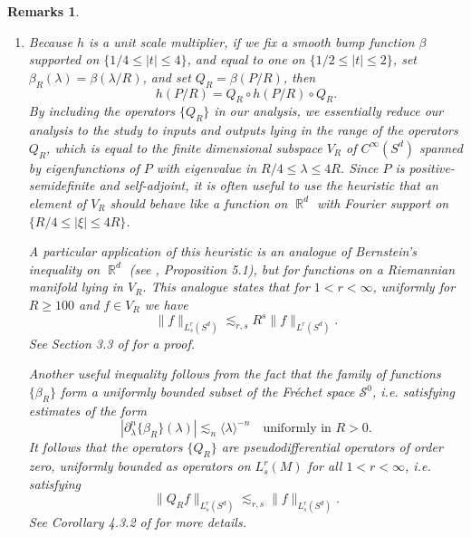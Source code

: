 \documentclass[dvipsnames,letterpaper,12pt]{article}
\DeclareMathOperator{\RR}{\mathbb{R}}
\newtheorem{remarks}[theorem]{Remarks}
\begin{document}
\begin{remarks}
\begin{enumerate}
    \item Because $h$ is a unit scale multiplier, if we fix a smooth bump function $\beta$ supported on $\{ 1/4 \leq |t| \leq 4 \}$, and equal to one on $\{ 1/2 \leq |t| \leq 2 \}$, set $\beta_R(\lambda) = \beta(\lambda / R)$, and set $Q_R = \beta(P/R)$, then
    \[ h(P/R) = Q_R \circ h(P/R) \circ Q_R. \]
    By including the operators $\{ Q_R \}$ in our analysis, we essentially reduce our analysis to the study to inputs and outputs lying in the range of the operators $Q_R$, which is equal to the finite dimensional subspace $V_R$ of $C^\infty(S^d)$ spanned by eigenfunctions of $P$ with eigenvalue in $R/4 \leq \lambda \leq 4R$. Since $P$ is positive-semidefinite and self-adjoint, it is often useful to use the heuristic that an element of $V_R$ should behave like a function on $\RR^d$ with Fourier support on $\{ R/4 \leq |\xi| \leq 4R \}$.

    A particular application of this heuristic is an analogue of Bernstein's inequality on $\RR^d$ (see \cite{Wolff},  Proposition 5.1), but for functions on a Riemannian manifold lying in $V_R$. This analogue states that for $1 < r < \infty$, uniformly for $R \geq 100$ and $f \in V_R$ we have
    \begin{equation} \label{ManifoldBernsteinInequality}
        \| f \|_{L^r_s(S^d)} \lesssim_{r,s} R^s \| f \|_{L^r(S^d)}.
    \end{equation}
    See Section 3.3 of \cite{Sogge} for a proof.

    Another useful inequality follows from the fact that the family of functions $\{ \beta_R \}$ form a uniformly bounded subset of the Fr\'{e}chet space $\mathcal{S}^0$, i.e. satisfying estimates of the form
    \[ |\partial_\lambda^n \{ \beta_R \}(\lambda)| \lesssim_n \langle \lambda \rangle^{-n} \quad\text{uniformly in $R > 0$}. \]
    It follows that the operators $\{ Q_R \}$ are pseudodifferential operators of order zero, uniformly bounded as operators on $L^r_s(M)$ for all $1 < r < \infty$, i.e. satisfying
    \begin{equation}
        \| Q_R f \|_{L^r_s(S^d)} \lesssim_{r,s} \| f \|_{L^r_s(S^d)}.
    \end{equation}
    See Corollary 4.3.2 of \cite{Sogge} for more details.
\end{enumerate}
\end{remarks}
\end{document}
